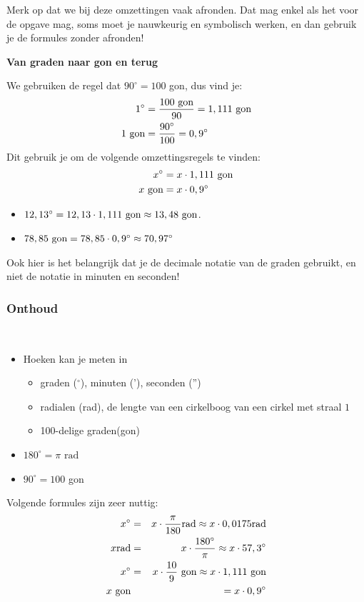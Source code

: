 Merk op dat we bij deze omzettingen vaak afronden. Dat mag enkel als het voor de opgave mag, soms moet je nauwkeurig en symbolisch werken, en dan gebruik je de formules zonder afronden!

\textbf{Van graden naar gon en terug}

We gebruiken de regel dat $90^\circ=100$ gon, dus vind je:
\begin{align*}
1^\circ &= \frac{100 \textup{ gon}}{90}= 1,111 \textup{ gon}\\
1 \textup{ gon} &= \frac{90^\circ}{100} = 0,9^\circ
\end{align*}
Dit gebruik je om de volgende omzettingsregels te vinden:
\begin{align*}
x^\circ &= x\cdot 1,111 \textup{ gon}\\
x \textup{ gon} &= x\cdot 0,9^\circ
\end{align*}

\begin{voorbeeld}
	
\begin{itemize}
	\item $12,13^\circ = 12,13 \cdot 1,111 \textup{ gon} \approx 13,48 \textup{ gon}$.
	\item $78,85 \textup{ gon} = 78,85 \cdot 0,9^\circ \approx 70,97^\circ$
\end{itemize}

\end{voorbeeld}
Ook hier is het belangrijk dat je de decimale notatie van de graden gebruikt, en niet de notatie in minuten en seconden!

\subsubsection{Onthoud}
\ \\
\begin{onthoud}
	\begin{itemize}
\item Hoeken kan je meten in
	
\begin{itemize}
	\item graden ($^\circ$), minuten ('), seconden ('')
	\item radialen (rad), de lengte van een cirkelboog van een cirkel met straal $1$
	\item 100-delige graden(gon)
\end{itemize}
\item $180^\circ=\pi \text{ rad}$
\item $90^\circ=100$ gon
\end{itemize}

Volgende formules zijn zeer nuttig:
\begin{eqnarray*}
x^\circ &=& x\cdot \frac{\pi}{180} \text{rad} \approx x\cdot 0,0175 \text{rad}\\
x \text{rad} &=& x \cdot \frac{180^\circ}{\pi} \approx x \cdot 57,3^\circ\\
x^\circ &=& x \cdot \frac{10}{9} \textup{ gon} \approx x \cdot 1,111 \textup{ gon}\\
x \textup{ gon} &&= x\cdot 0,9^\circ
\end{eqnarray*}
\end{onthoud}



